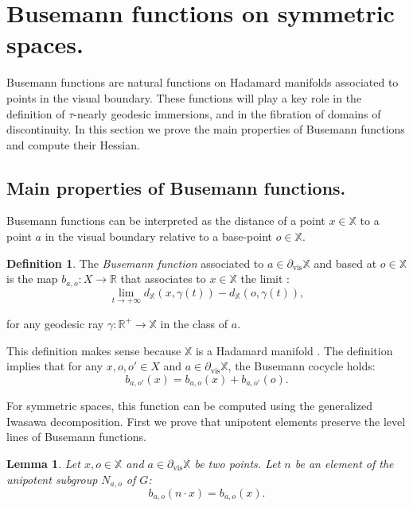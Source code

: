 \documentclass[reqno,10pt]{amsart}
\theoremstyle{plain}
\newtheorem{lem}[thm]{Lemma}
\theoremstyle{definition}
\newtheorem{defn}[thm]{Definition}
\theoremstyle{remark}
\newcommand{\type}{\tau}
\newcommand{\R}{\mathbb{R}}
\DeclareMathOperator{\vis}{vis}
\newcommand{\partialvis}{\partial_{\vis}}
\newcommand{\X}{\mathbb{X}}
\begin{document}
\section{Busemann functions on symmetric spaces.}
\label{sec:BusemannFunctions}

Busemann functions are natural functions on Hadamard manifolds associated to points in the visual boundary. These functions will play a key role in the definition of $\type$-nearly geodesic immersions, and in the fibration of domains of discontinuity. In this section we prove the main properties of Busemann functions and compute their Hessian.

\subsection{Main properties of Busemann functions.}

 Busemann functions can be interpreted as the distance of a point $x\in \X$ to a point $a$ in the visual boundary relative to a base-point $o\in \X$.

\begin{defn}
 The \emph{Busemann function} associated to $a\in \partialvis\X$ and based at $o\in \X$ is the map $b_{a,o}:X\to \R$ that associates to $x\in \X$ the limit :
 $$\lim_{t\to +\infty} d_\X(x,\gamma(t))-d_\X(o,\gamma(t)),$$
 
 for any geodesic ray $\gamma:\R^+\to \X$ in the class of $a$.
 
\end{defn}

This definition makes sense because $\X$ is a Hadamard manifold \cite{Eberlein}. The definition implies that for any $x,o,o'\in X$ and $a\in \partialvis \X$, the Busemann cocycle holds:
\begin{equation}
\label{eq:BusemannCocycle}
b_{a,o'}(x)=b_{a,o}(x)+b_{a,o'}(o).
\end{equation}

\medskip

For symmetric spaces, this function can be computed using the generalized Iwasawa decomposition. First we prove that unipotent elements preserve the level lines of Busemann functions.

\begin{lem}

Let $x,o\in \X$ and $a\in \partialvis \X$ be two points. Let $n$ be an element of the unipotent subgroup $N_{a,o}$ of $G$:
$$ b_{a,o}(n\cdot x)=b_{a,o}(x).$$

\end{lem}
\end{document}
